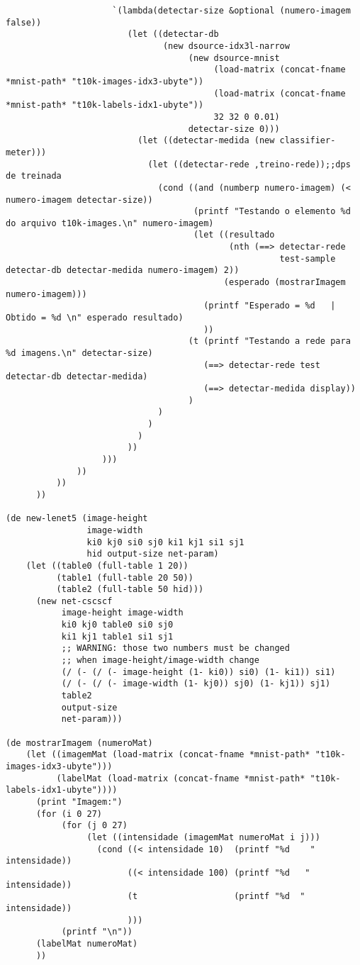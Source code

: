 \documentclass[11pt]{article}
\begin{document}
\begin{verbatim}
                     `(lambda(detectar-size &optional (numero-imagem false))
                        (let ((detectar-db
                               (new dsource-idx3l-narrow
                                    (new dsource-mnist
                                         (load-matrix (concat-fname *mnist-path* "t10k-images-idx3-ubyte"))
                                         (load-matrix (concat-fname *mnist-path* "t10k-labels-idx1-ubyte"))
                                         32 32 0 0.01)
                                    detectar-size 0)))
                          (let ((detectar-medida (new classifier-meter)))
                            (let ((detectar-rede ,treino-rede));;dps de treinada
                              (cond ((and (numberp numero-imagem) (< numero-imagem detectar-size))
                                     (printf "Testando o elemento %d do arquivo t10k-images.\n" numero-imagem)
                                     (let ((resultado
                                            (nth (==> detectar-rede 
                                                      test-sample detectar-db detectar-medida numero-imagem) 2))
                                           (esperado (mostrarImagem numero-imagem)))
                                       (printf "Esperado = %d   |   Obtido = %d \n" esperado resultado)
                                       ))
                                    (t (printf "Testando a rede para %d imagens.\n" detectar-size) 
                                       (==> detectar-rede test detectar-db detectar-medida)
                                       (==> detectar-medida display))
                                    )
                              )
                            )
                          )
                        ))
                   )))
              ))
          ))
      ))

(de new-lenet5 (image-height
                image-width
                ki0 kj0 si0 sj0 ki1 kj1 si1 sj1
                hid output-size net-param)
    (let ((table0 (full-table 1 20))
          (table1 (full-table 20 50))
          (table2 (full-table 50 hid)))
      (new net-cscscf
           image-height image-width
           ki0 kj0 table0 si0 sj0
           ki1 kj1 table1 si1 sj1
           ;; WARNING: those two numbers must be changed
           ;; when image-height/image-width change
           (/ (- (/ (- image-height (1- ki0)) si0) (1- ki1)) si1)
           (/ (- (/ (- image-width (1- kj0)) sj0) (1- kj1)) sj1)
           table2
           output-size
           net-param)))

(de mostrarImagem (numeroMat)
    (let ((imagemMat (load-matrix (concat-fname *mnist-path* "t10k-images-idx3-ubyte")))
          (labelMat (load-matrix (concat-fname *mnist-path* "t10k-labels-idx1-ubyte"))))
      (print "Imagem:")
      (for (i 0 27)
           (for (j 0 27)
                (let ((intensidade (imagemMat numeroMat i j)))
                  (cond ((< intensidade 10)  (printf "%d    " intensidade))
                        ((< intensidade 100) (printf "%d   "  intensidade))
                        (t                   (printf "%d  "   intensidade))
                        )))
           (printf "\n"))
      (labelMat numeroMat)
      ))
\end{verbatim}
\end{document}
